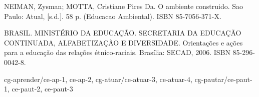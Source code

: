 {{    NEIMAN, Zysman; MOTTA, Cristiane Pires Da. O ambiente construido. Sao Paulo: Atual, [s.d.]. 58 p. (Educacao Ambiental). ISBN 85-7056-371-X.

    BRASIL. MINISTÉRIO DA EDUCAÇÃO. SECRETARIA DA EDUCAÇÃO CONTINUADA, ALFABETIZAÇÃO E DIVERSIDADE. Orientações e ações para a educação das relações étnico-raciais. Brasília: SECAD, 2006. ISBN 85-296-0042-8.
    }
    \competencias
    {
        cg-aprender/{ce-ap-1, ce-ap-2},
        cg-atuar/{ce-atuar-3, ce-atuar-4},
        cg-pautar/{ce-paut-1, ce-paut-2, ce-paut-3}
    }
}